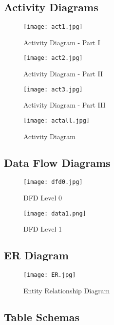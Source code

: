 \documentclass[a4paper,12pt]{report}
\begin{document}
\pagebreak
\FloatBarrier
\subsection{Activity Diagrams }

\begin{figure}[h!]
\centering
\texttt{[image: act1.jpg]}
\caption{Activity Diagram - Part I}
\end{figure}


\begin{figure}[h!]
\centering
\texttt{[image: act2.jpg]}
\caption{Activity Diagram - Part II}
\end{figure}

\begin{figure}[h!]
\centering
\texttt{[image: act3.jpg]}
\caption{Activity Diagram - Part III}
\end{figure}

\begin{figure}[h!]
\centering
\texttt{[image: actall.jpg]}
\caption{Activity Diagram }
\end{figure}

\FloatBarrier

\subsection{Data Flow Diagrams }

\begin{figure}[h!]
\centering
\texttt{[image: dfd0.jpg]}
\caption{DFD Level 0}
\end{figure}

\begin{figure}[h!]
\centering
\texttt{[image: data1.png]}
\caption{DFD Level 1}
\end{figure}

\pagebreak
\FloatBarrier
\subsection{ER Diagram}

\begin{figure}[h!]
\centering
\texttt{[image: ER.jpg]}
\caption{Entity Relationship Diagram}
\end{figure}


\pagebreak 
\FloatBarrier
\subsection{Table Schemas}
\end{document}
